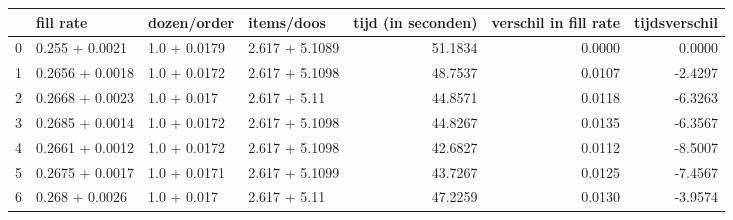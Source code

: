 \begin{tabular}{llllrrr}
\toprule
{} &        fill rate &   dozen/order &      items/doos &  tijd (in seconden) &  verschil in fill rate &  tijdsverschil \\
\midrule
0 &   0.255 + 0.0021 &  1.0 + 0.0179 &  2.617 + 5.1089 &             51.1834 &                 0.0000 &         0.0000 \\
1 &  0.2656 + 0.0018 &  1.0 + 0.0172 &  2.617 + 5.1098 &             48.7537 &                 0.0107 &        -2.4297 \\
2 &  0.2668 + 0.0023 &   1.0 + 0.017 &    2.617 + 5.11 &             44.8571 &                 0.0118 &        -6.3263 \\
3 &  0.2685 + 0.0014 &  1.0 + 0.0172 &  2.617 + 5.1098 &             44.8267 &                 0.0135 &        -6.3567 \\
4 &  0.2661 + 0.0012 &  1.0 + 0.0172 &  2.617 + 5.1098 &             42.6827 &                 0.0112 &        -8.5007 \\
5 &  0.2675 + 0.0017 &  1.0 + 0.0171 &  2.617 + 5.1099 &             43.7267 &                 0.0125 &        -7.4567 \\
6 &   0.268 + 0.0026 &   1.0 + 0.017 &    2.617 + 5.11 &             47.2259 &                 0.0130 &        -3.9574 \\
\bottomrule
\end{tabular}
